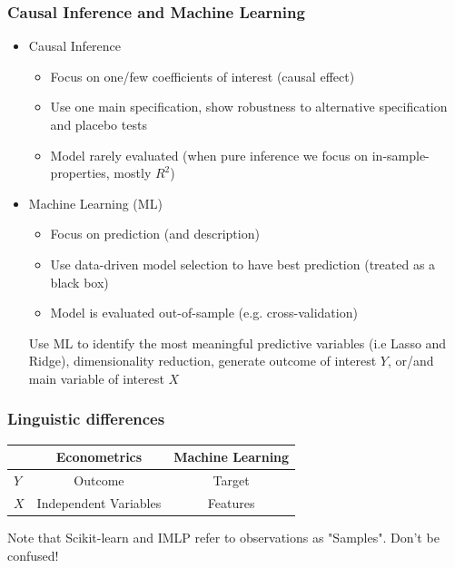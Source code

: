 \documentclass[compress, aspectratio=54]{beamer}
\begin{document}
\begin{frame}
\frametitle{Causal Inference and Machine Learning}
\begin{itemize}
\item Causal Inference
\begin{itemize}

\item Focus on one/few coefficients of interest (causal effect)
\item Use one main specification, show robustness to alternative specification and placebo tests
\item Model rarely evaluated (when pure inference we focus on in-sample-properties, mostly $R^2$)
\end{itemize}

\item Machine Learning (ML)
\begin{itemize}

\item Focus on prediction (and description)
\item  Use data-driven model selection to have best prediction (treated as a black box)
\item Model is evaluated out-of-sample (e.g. cross-validation)
\end{itemize}

Use ML to identify the most meaningful predictive variables (i.e Lasso and Ridge), dimensionality reduction, generate outcome of interest $Y$, or/and main variable of interest $X$
\end{itemize}
\end{frame}


\begin{frame}
\frametitle{Linguistic differences}

\begin{center}
\begin{tabular}{lcc}
  \hline
   &Econometrics&Machine Learning\\ \hline
$Y$ &  Outcome& Target  \\ 
$X$   &  Independent Variables  & Features \\ \hline
\end{tabular}
\end{center}
Note that Scikit-learn and  IMLP refer to observations as "Samples".  Don't be confused!
\end{frame}
\end{document}
